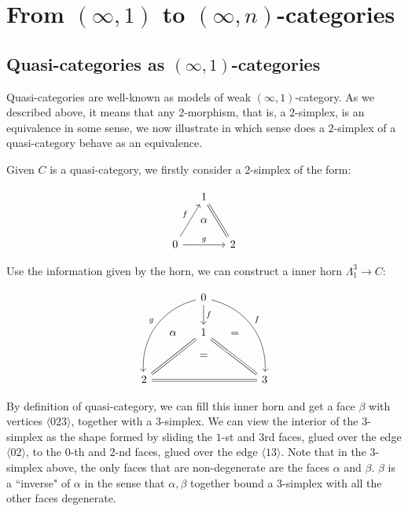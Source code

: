 \documentclass[11pt]{article}
\begin{document}
\section{From $(\infty,1)$ to $(\infty,n)$-categories}
\subsection{Quasi-categories as $(\infty,1)$-categories}

Quasi-categories are well-known as models of weak $(\infty,1)$-category. As we described above, it means that any $2$-morphism, that is, a $2$-simplex, is an equivalence in some sense, we now illustrate in which sense does a $2$-simplex of a quasi-category behave as an equivalence.

Given $C$ is a quasi-category, we firstly consider a $2$-simplex of the form:


  \begin{equation*}
\begin{tikzcd}[column sep=small, row sep=small]
& 1 \arrow[equal]{rdd}{} \\
& \alpha \\
0 \arrow{uur}{f} \arrow{rr}{g} &  & 2
\end{tikzcd}
\end{equation*}


Use the information given by the horn, we can construct a inner horn $\Lambda^3_1\to C$:


\begin{equation*}
\begin{tikzcd}[column sep=small, row sep=small]
& & 0 \arrow{dd}{f}\arrow[swap,bend right=40]{ddddll}{g} \arrow[bend left=40]{ddddrr}{f} \\
\\
& \alpha & 1\arrow[equal]{ddll}{} \arrow[equal]{ddrr}{} & = \\
& & = \\
2 \arrow[equal]{rrrr}{} & & & & 3
\end{tikzcd}
\end{equation*}

By definition of quasi-category, we can fill this inner horn and get a face $\beta$ with vertices $\langle 023\rangle$, together with a $3$-simplex. We can view the interior of the $3$-simplex as the shape formed by sliding the $1$-st and $3$rd faces, glued over the edge $\langle 02\rangle$, to the $0$-th and $2$-nd faces, glued over the edge $\langle 13\rangle$. Note that in the $3$-simplex above, the only faces that are non-degenerate are the faces $\alpha$ and $\beta$. $\beta$ is a ``inverse" of $\alpha$ in the sense that $\alpha,\beta$ together bound a $3$-simplex with all the other faces degenerate.
\end{document}
